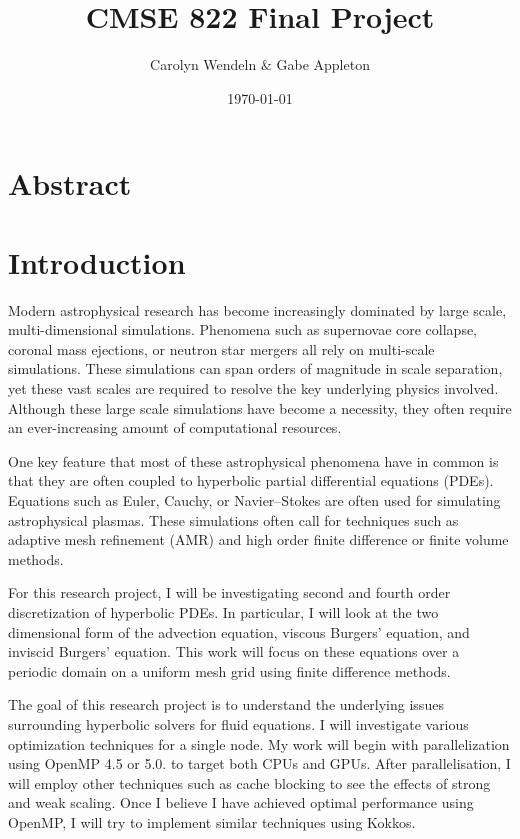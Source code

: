 \documentclass{article}
\title{CMSE 822 Final Project }
\author{Carolyn Wendeln $\&$ Gabe Appleton}
\date{\today}
\begin{document}
\maketitle

\section{Abstract}
\section{Introduction}

Modern astrophysical research has become increasingly dominated by large scale, multi-dimensional simulations.
Phenomena such as supernovae core collapse, coronal mass ejections, or neutron star mergers all rely on multi-scale simulations.
These simulations can span orders of magnitude in scale separation, yet these vast scales are required to resolve the key underlying physics involved.
Although these large scale simulations have become a necessity, they often require an ever-increasing amount of computational resources.

One key feature that most of these astrophysical phenomena have in common is that they are often coupled to hyperbolic partial differential equations (PDEs).
Equations such as Euler, Cauchy, or Navier–Stokes are often used for simulating astrophysical plasmas.
These simulations often call for techniques such as adaptive mesh refinement (AMR) and high order finite difference or finite volume methods.

For this research project, I will be investigating second and fourth order discretization of hyperbolic PDEs.
In particular, I will look at the two dimensional form of the advection equation, viscous Burgers' equation, and inviscid Burgers' equation.
This work will focus on these equations over a periodic domain on a uniform mesh grid using finite difference methods.

The goal of this research project is to understand the underlying issues surrounding hyperbolic solvers for fluid equations.
I will investigate various optimization techniques for a single node.
My work will begin with parallelization using OpenMP 4.5 or 5.0. to target both CPUs and GPUs.
After parallelisation, I will employ other techniques such as cache blocking to see the effects of strong and weak scaling.
Once I believe I have achieved optimal performance using OpenMP, I will try to implement similar techniques using Kokkos.
\end{document}
